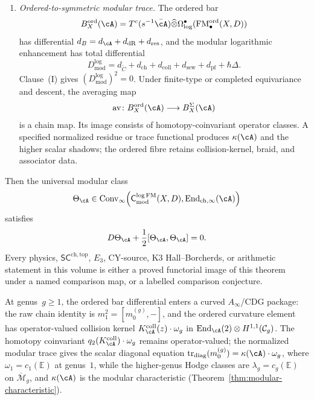 \begin{theorem}
\begin{enumerate}[label=\textup{(\Roman*)}]
algebraic, topological, and categorical Hochschild theories are
carried by named functors.
\item \emph{Ordered-to-symmetric modular trace.}  The ordered bar
\[
B_X^{\mathrm{ord}}(\cA)
=T^c(s^{-1}\bar\cA)\widehat\otimes
\Omega^\bullet_{\log}(\mathrm{FM}^{\mathrm{ord}}_\bullet(X,D))
\]
has differential \(d_B=d_\cA+d_{\mathrm{dR}}+d_{\mathrm{res}}\), and
the modular logarithmic enhancement has total differential
\[
D_{\mathrm{mod}}^{\log}
=d_{\check C}+d_{\mathrm{ch}}+d_{\mathrm{coll}}
+d_{\mathrm{sew}}+d_{\mathrm{pf}}+\hbar\Delta .
\]
Clause~\textup{(I)} gives
\((D_{\mathrm{mod}}^{\log})^2=0\).  Under finite-type or completed
equivariance and descent, the averaging map
\[
\mathrm{av}\colon B_X^{\mathrm{ord}}(\cA)\longrightarrow B_X^\Sigma(\cA)
\]
is a chain map.  Its image consists of homotopy-coinvariant operator
classes.  A specified normalized
residue or trace functional produces \(\kappa(\cA)\) and the higher
scalar shadows; the ordered fibre retains collision-kernel, braid,
and associator data.
\end{enumerate}

Then the universal modular class
\[
\Theta_\cA\in
\operatorname{Conv}_\infty\!\left(
\mathsf C^{\log\mathrm{FM}}_{\mathrm{mod}}(X,D),
\operatorname{End}_{\mathrm{ch},\infty}(\cA)\right)
\]
satisfies
\[
D\Theta_\cA+\frac12[\Theta_\cA,\Theta_\cA]=0.
\]
Every physics, \(\mathsf{SC}^{\mathrm{ch,top}}\), \(E_3\), CY-source,
K3 Hall--Borcherds, or arithmetic statement in this volume is either a
proved functorial image of this theorem under a named comparison map,
or a labelled comparison conjecture.
\end{theorem}

At genus~$g \geq 1$, the ordered bar differential enters a curved
$A_\infty$/CDG package: the raw chain identity is
$m_1^2=[m_0^{(g)},-]$, and the ordered curvature element has
operator-valued collision kernel $K_\cA^{\mathrm{coll}}(z)\cdot\omega_g$ in
$\operatorname{End}_\cA(2) \otimes H^{1,1}(\mathcal{C}_g)$.
The homotopy coinvariant
$q_2(K_\cA^{\mathrm{coll}})\cdot\omega_g$ remains operator-valued;
the normalized modular trace gives the scalar diagonal equation
$\operatorname{tr}_{\mathrm{diag}}(m_0^{(g)})
= \kappa(\cA) \cdot \omega_g$, where
$\omega_1 = c_1(\mathbb{E})$ at genus~$1$, while the higher-genus
Hodge classes are $\lambda_g = c_g(\mathbb{E})$ on
$\overline{\mathcal{M}}_g$, and
$\kappa(\cA)$ is the modular
characteristic
(Theorem~\ref{thm:modular-characteristic}).

